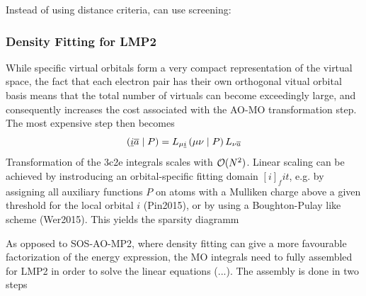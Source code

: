 


Instead of using distance criteria, can use screening: 

\subsubsection{Density Fitting for LMP2}

While specific virtual orbitals form a very compact representation of the virtual space, the fact that each electron pair has their own orthogonal vitual orbital basis means that the total number of virtuals can become exceedingly large, and consequently increases the cost associated with the AO-MO transformation step. The most expensive step then becomes
\begin{equation}
\left( \underline{i}\overline{a} \mid P \right) = L_{\mu\underline{i}} \left( \mu\nu \mid P \right) L_{\nu\overline{a}}
\end{equation}
\noindent Transformation of the 3c2e integrals scales with $\mathcal{O}(N^{2})$. Linear scaling can be achieved by instroducing an orbital-specific fitting domain $[i]_fit$, e.g. by assigning all auxiliary functions $P$ on atoms with a Mulliken charge above a given threshold for the local orbital $i$ (Pin2015), or by using a Boughton-Pulay like scheme (Wer2015). This yields the sparsity diagramm
\begin{center}
\end{center}
\noindent As opposed to SOS-AO-MP2, where density fitting can give a more favourable factorization of the energy expression, the MO integrals need to fully assembled for LMP2 in order to solve the linear equations (...). The assembly is done in two steps
